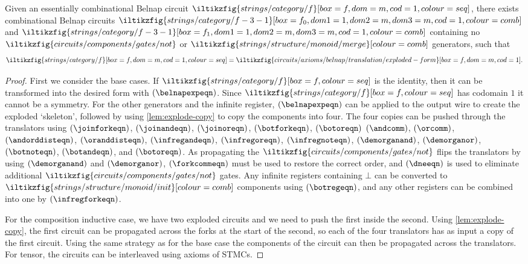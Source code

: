 \begin{proposition}\label{prop:exploded-belnap}
    Given an essentially combinational Belnap circuit \(
    \iltikzfig{strings/category/f}[box=f,dom=m,cod=1,colour=seq]
    \), there exists combinational Belnap circuits \(
    \iltikzfig{strings/category/f-3-1}[box=f_0,dom1=1,dom2=m,dom3=m,cod=1,colour=comb]
    \) and \(
    \iltikzfig{strings/category/f-3-1}[box=f_1,dom1=1,dom2=m,dom3=m,cod=1,colour=comb]
    \) containing no \(
    \iltikzfig{circuits/components/gates/not}
    \) or \(
    \iltikzfig{strings/structure/monoid/merge}[colour=comb]
    \) generators, such that \[
        \iltikzfig{strings/category/f}[box=f,dom=m,cod=1,colour=seq]
        =
        \iltikzfig{circuits/axioms/belnap/translation/exploded-form}[box=f,dom=m,cod=1].
    \]
\end{proposition}
\begin{proof}
    First we consider the base cases.
    If \(
    \iltikzfig{strings/category/f}[box=f,colour=seq]
    \) is the identity, then it can be transformed into the desired form
    with
    \((\belnapexpeqn)\).
    Since \(\iltikzfig{strings/category/f}[box=f,colour=seq]\) has codomain
    \(1\) it cannot be a symmetry.
    For the other generators and the infinite register,
    \((\belnapexpeqn)\) can be applied to the output wire to create the
    exploded `skeleton', followed by using \cref{lem:explode-copy} to copy the
    components into four.
    The four copies can be pushed through the translators
    using \((\joinforkeqn)\), \((\joinandeqn)\), \((\joinoreqn)\),
    \((\botforkeqn)\), \((\botoreqn)\) \((\andcomm)\), \((\orcomm)\),
    \((\andorddisteqn)\), \((\oranddisteqn)\), \((\infregandeqn)\),
    \((\infregoreqn)\), \((\infregnoteqn)\), \((\demorganand)\),
    \((\demorganor)\), \((\botnoteqn)\), \((\botandeqn)\), and \((\botoreqn)\).
    As propagating the \(
    \iltikzfig{circuits/components/gates/not}
    \) flips the translators by using \((\demorganand)\) and \((\demorganor)\),
    \((\forkcommeqn)\) must be used to restore the correct order, and
    \((\dneeqn)\) is used to eliminate additional
    \(\iltikzfig{circuits/components/gates/not}\) gates.
    Any infinite registers containing \(\bot\) can be converted to
    \(\iltikzfig{strings/structure/monoid/init}[colour=comb]\) components using
    \((\botregeqn)\), and any other registers can be combined into one by
    \((\infregforkeqn)\).

    For the composition inductive case, we have two exploded circuits and we
    need to push the first inside the second.
    Using \cref{lem:explode-copy}, the first circuit can be propagated across
    the forks at the start of the second, so each of the four translators has as
    input a copy of the first circuit.
    Using the same strategy as for the base case the components of the circuit
    can then be propagated across the translators.
    For tensor, the circuits can be interleaved using axioms of STMCs.
\end{proof}

